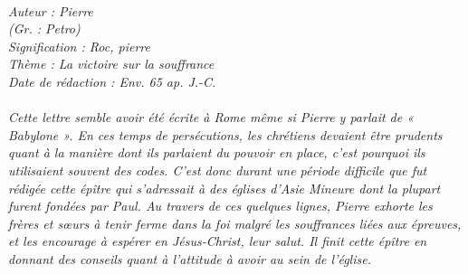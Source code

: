 \BFont
\noindent\hrulefill
{\footnotesize
\textit{
\bigskip
{\centering{}
\\Auteur : Pierre
\\(Gr. : Petro)
\\Signification : Roc, pierre
\\Thème : La victoire sur la souffrance
\\Date de rédaction : Env. 65 ap. J.-C.\\}
}
\textit{
\\Cette lettre semble avoir été écrite à Rome même si Pierre y parlait de « Babylone ». En ces temps de persécutions, les chrétiens devaient être prudents quant à la manière dont ils parlaient du pouvoir en place, c'est pourquoi ils utilisaient souvent des codes. C'est donc durant une période difficile que fut rédigée cette épître qui s'adressait à des églises d'Asie Mineure dont la plupart furent fondées par Paul. Au travers de ces quelques lignes, Pierre exhorte les frères et sœurs à tenir ferme dans la foi malgré les souffrances liées aux épreuves, et les encourage à espérer en Jésus-Christ, leur salut. Il finit cette épître en donnant des conseils quant à l'attitude à avoir au sein de l'église.\bigskip
}
}
\par\nobreak\noindent\hrulefill
